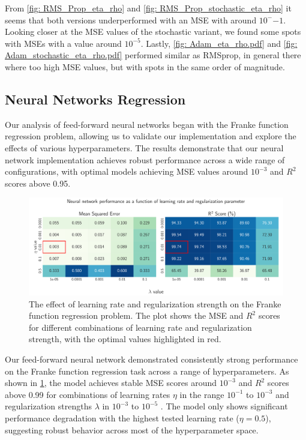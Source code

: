 From \cref{fig: RMS_Prop_eta_rho} and \cref{fig: RMS_Prop_stochastic_eta_rho} it seems that both versions underperformed with an MSE with around \( 10^-{-1} \). Looking closer at the MSE values of the stochastic variant, we found some spots with MSEs with a value around \( 10^{-5} \). Lastly, \cref{fig: Adam_eta_rho.pdf} and \cref{fig: Adam_stochastic_eta_rho.pdf} performed similar as RMSprop, in general there where too high MSE values, but with spots in the same order of magnitude.

\subsection{Neural Networks Regression}

Our analysis of feed-forward neural networks began with the Franke function regression problem, allowing us to validate our implementation and explore the effects of various hyperparameters. The results demonstrate that our neural network implementation achieves robust performance across a wide range of configurations, with optimal models achieving MSE values around \( 10^{-3} \) and \( R^2 \) scores above 0.95.

\onecolumngrid
\begin{figure}[ht!]
    \centering
    \includegraphics[width = .9\textwidth]{../figs/c_eta_lambda.pdf}
    \caption{The effect of learning rate and regularization strength on the Franke function regression problem. The plot shows the MSE and \( R^2 \) scores for different combinations of learning rate and regularization strength, with the optimal values highlighted in red.}
    \label{fig:NN_Franke_eta_lambda}
\end{figure}
\twocolumngrid

Our feed-forward neural network demonstrated consistently strong performance on the Franke function regression task across a range of hyperparameters. As shown in \cref{fig:NN_Franke_eta_lambda}, the model achieves stable MSE scores around $10^{-3}$ and $R^2$ scores above 0.99 for combinations of learning rates $ \eta $ in the range $ 10^{-1} $ to $ 10^{-3}$ and regularization strengths $ \lambda $ in $ 10^{-3} $ to $ 10^{-5}$ . The model only shows significant performance degradation with the highest tested learning rate ($\eta = 0.5$), suggesting robust behavior across most of the hyperparameter space.

